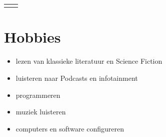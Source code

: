 \documentclass[
	11pt, %
]{FreemanCV}
\begin{document}
\begin{paracol}{2}
\begin{supertabular}{r l}

	\end{supertabular}

	\section{Hobbies}

	\begin{itemize}
		\item lezen van klassieke literatuur en Science Fiction
		\item luisteren naar Podcasts en infotainment
		\item programmeren
		\item muziek luisteren
		\item computers en software configureren
	\end{itemize}










\end{paracol}
\end{document}
